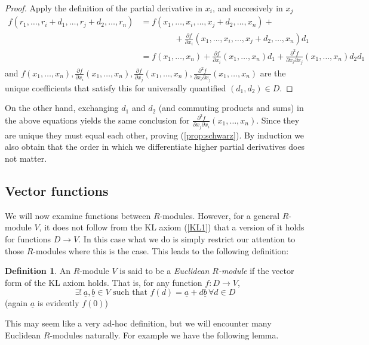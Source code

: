 \documentclass[11pt]{article}
\theoremstyle{definition}
\newtheorem{defn}{Definition}[section]
\newcommand{\ddx}[2]{\frac{\partial #1}{\partial #2}} %
\newcommand{\ddxII}[3]{\frac{\partial^{2} #1}{\partial #2 \partial #3}} %
\renewcommand{\vec}{\underline} %
\numberwithin{equation}{section}
\begin{document}
\begin{proof}
  Apply the definition of the partial derivative in \( x_i \), and succesively in \( x_j \)
  \begin{align*}
    f(r_1,\dots,r_i+d_1,\dots,r_j+d_2,\dots,r_n) & = f(x_1,\dots,x_i,\dots,x_j+d_2,\dots,x_n) + \\
                                                 & \qquad\qquad + \ddx{f}{x_i}(x_1,\dots,x_i,\dots,x_j+d_2,\dots,x_n)d_1 \\
                                                 & = f(x_1,\dots,x_n) + \ddx{f}{x_i}(x_1,\dots,x_n)d_1 + \ddxII{f}{x_i}{x_j}(x_1,\dots,x_n)d_2d_1
  \end{align*}
  and \( f(x_1,\dots,x_n), \ddx{f}{x_i}(x_1,\dots,x_n), \ddx{f}{x_j}(x_1,\dots,x_n), \ddxII{f}{x_i}{x_j}(x_1,\dots,x_n)  \) are the unique coefficients that satisfy this for universally quantified \( (d_1,d_2)\in D \).
\end{proof}

On the other hand, exchanging \( d_1 \) and \( d_2 \) (and commuting products and sums) in the above equations yields the same conclusion for \( \ddxII{f}{x_j}{x_i}(x_1,\dots,x_n) \). Since they are unique they must equal each other, proving (\ref{prop:schwarz}). By induction we also obtain that the order in which we differentiate higher partial derivatives does not matter.

\subsection{Vector functions}
We will now examine functions between \( R \)-modules. However, for a general \( R \)-module \( V \), it does not follow from the KL axiom (\ref{KL1}) that a version of it holds for functions \( D\to V \). In this case what we do is simply restrict our attention to those \( R \)-modules where this is the case. This leads to the following definition:

\begin{defn}
  An \( R \)-module \( V \) is said to be a \emph{Euclidean \( R \)-module} if the vector form of the KL axiom holds. That is, for any function \( f: D\to V \),
  \[
    \exists! \, \vec a,\vec b\in V \text{ such that } f(d) = \vec a + d\vec b \,\forall d\in D
  \]
  (again \( \vec a \) is evidently \( f(0) \))
\end{defn}

This may seem like a very ad-hoc definition, but we will encounter many Euclidean \( R \)-modules naturally. For example we have the following lemma.
\end{document}

